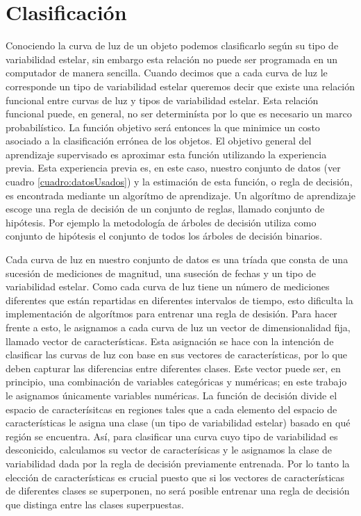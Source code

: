 \documentclass[letterpaper,12pt]{book}
\begin{document}
\chapter{Clasificación}\label{cap:clasificacion} 

Conociendo la curva de luz de un objeto podemos clasificarlo según su tipo de variabilidad estelar, sin embargo esta relación no puede ser programada en un computador de manera sencilla. Cuando decimos que a cada curva de luz le corresponde un tipo de variabilidad estelar queremos decir que existe una relación funcional entre curvas de luz y tipos de variabilidad estelar. Esta relación funcional puede, en general,  no ser determinísta por lo que es necesario un marco probabilístico. La función objetivo será entonces la que minimice un costo asociado a la clasificación errónea de los objetos.  El objetivo general del aprendizaje supervisado es aproximar esta función utilizando la experiencia previa. Esta experiencia previa es, en este caso, nuestro conjunto de datos (ver cuadro \ref{cuadro:datosUsados}) y la estimación de esta función, o regla de decisión, es encontrada mediante un algorítmo de aprendizaje. Un algorítmo de aprendizaje escoge una regla de decisión de un conjunto de reglas, llamado conjunto de hipótesis. Por ejemplo la metodología de árboles de decisión utiliza como conjunto de hipótesis el conjunto de todos los árboles de decisión binarios. 

Cada curva de luz en nuestro conjunto de datos es una tríada que consta de una sucesión de mediciones de magnitud, una suseción de fechas y un tipo de variabilidad estelar. Como cada curva de luz tiene un número de mediciones diferentes que están repartidas en diferentes intervalos de tiempo, esto dificulta la implementación de algorítmos para entrenar una regla de desisión. Para hacer frente a esto, le asignamos a cada curva de luz un vector de dimensionalidad fija, llamado vector de características. Esta asignación se hace con la intención de clasificar las curvas de luz con base en sus vectores de características, por lo que deben capturar las diferencias entre diferentes clases. Este vector puede ser, en principio, una combinación de variables categóricas y numéricas; en este trabajo le asignamos únicamente variables numéricas. La función de decisión divide el espacio de caracterísitcas en regiones tales que a cada elemento del espacio de características le asigna una clase (un tipo de variabilidad estelar) basado en qué región se encuentra. Así, para clasificar una curva cuyo tipo de variabilidad es desconicido, calculamos su vector de caracterísicas y le asignamos la clase de variabilidad dada por la regla de decisión previamente entrenada. Por lo tanto la elección de características es crucial puesto que si los vectores de características de diferentes clases se superponen, no será posible entrenar una regla de decisión que distinga entre las clases superpuestas.
\end{document}
